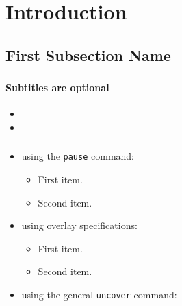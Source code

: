\section{Introduction}

\subsection[Short First Subsection Name]{First Subsection Name}

\begin{frame}
\frametitle{}
\framesubtitle{Subtitles are optional}

\begin{itemize}
  \item
  \item
\end{itemize}
\end{frame}

\begin{frame}
\frametitle{}

\begin{itemize}
  \item using the \texttt{pause} command:
  \begin{itemize}
    \item First item.
    \pause
    \item Second item.
  \end{itemize}
  \item using overlay specifications:
  \begin{itemize}
    \item<3-> First item.
    \item<4-> Second item.
  \end{itemize}
  \item using the general \texttt{uncover} command:
  \begin{itemize}
  \end{itemize}
\end{itemize}
\end{frame}


